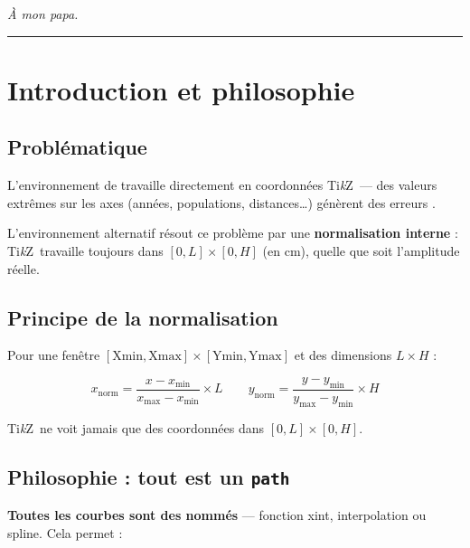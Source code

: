 \documentclass[11pt,a4paper]{ltxdoc}
\providecommand\tikzlogo{Ti\textit{k}Z}
\let\TikZ\tikzlogo
\begin{document}
\vfill\hfill{\footnotesize\textit{\ttfamily À mon papa.}}\vspace*{5mm}

\pagebreak

\tableofcontents
\vspace*{5mm}\hrule\vspace*{5mm}
\pagebreak

\section{Introduction et philosophie}

\subsection{Problématique}

L'environnement  de  travaille directement en coordonnées \TikZ\ — des valeurs extrêmes sur les axes (années, populations, distances\ldots) génèrent des erreurs .

\smallskip

L'environnement alternatif  résout ce problème par une \textbf{normalisation interne} : \TikZ\ travaille toujours dans $[0,L] \times [0,H]$ (en cm), quelle que soit l'amplitude réelle.

\subsection{Principe de la normalisation}

Pour une fenêtre $[\text{Xmin}, \text{Xmax}] \times [\text{Ymin}, \text{Ymax}]$ et des dimensions $L \times H$ :

\[
x_{\text{norm}} = \frac{x - x_{\min}}{x_{\max} - x_{\min}} \times L
\qquad
y_{\text{norm}} = \frac{y - y_{\min}}{y_{\max} - y_{\min}} \times H
\]

\TikZ\ ne voit jamais que des coordonnées dans $[0,L] \times [0,H]$.

\subsection{Philosophie : tout est un \texttt{path}}

\textbf{Toutes les courbes sont des  nommés} — fonction xint, interpolation ou spline. Cela permet :
\end{document}
